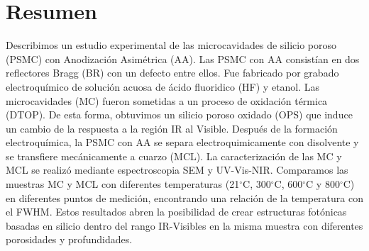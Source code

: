 \documentclass[a4paper,11pt,]{book}
\newcommand{\grad}{$^{\circ}$}
\begin{document}
\section{Resumen}
Describimos un estudio  experimental de las  microcavidades de silicio poroso (PSMC)  con Anodización Asimétrica (AA). Las PSMC con AA consistían en dos reflectores Bragg (BR) con un defecto entre ellos. Fue fabricado por grabado electroquímico de solución acuosa de ácido fluoridico (HF) y etanol. Las microcavidades (MC) fueron sometidas a un proceso de oxidación térmica  (DTOP). De esta forma, obtuvimos un silicio poroso oxidado (OPS) que induce un cambio de la respuesta a la región IR al Visible. Después de la formación electroquímica, la PSMC con AA se separa electroquimicamente con disolvente y se transfiere mecánicamente a cuarzo (MCL). La caracterización de las MC y MCL se realizó mediante espectroscopia SEM  y UV-Vis-NIR. Comparamos las muestras MC y MCL con diferentes temperaturas 
(21\grad C, 300\grad C, 600\grad C y 800\grad C) en diferentes puntos de medición, encontrando una relación de la temperatura con el FWHM. Estos resultados abren la posibilidad de crear estructuras fotónicas basadas en silicio dentro del rango IR-Visibles en la misma muestra con diferentes porosidades y profundidades. 
\end{document}
